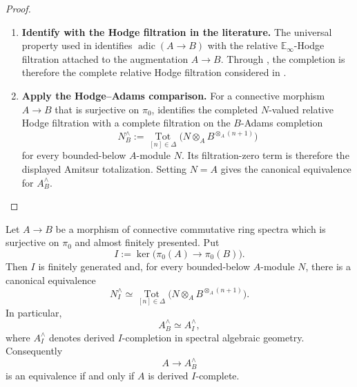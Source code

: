 \begin{proof}
\leavevmode
\begin{enumerate}[label=\textup{(\arabic*)}]
    \item \textbf{Identify with the Hodge filtration in the literature.}
    The universal property used in
     identifies
    \(\operatorname{adic}(A\to B)\) with the relative
    \(\mathbb E_\infty\)-Hodge filtration attached to the augmentation
    \(A\to B\). Through
    , the completion is therefore the
    complete relative Hodge filtration considered in
    \cite[Construction~2.1 and Lemma~2.2]{AntieauFiltrationsCohomologyIII2025}.
    \item \textbf{Apply the Hodge--Adams comparison.}
    For a connective morphism \(A\to B\) that is surjective on \(\pi_0\),
    \cite[Proposition~2.17]{AntieauFiltrationsCohomologyIII2025} identifies the
    completed \(N\)-valued relative Hodge filtration with a complete
    filtration on the \(B\)-Adams completion
    \[
        N_B^\wedge
        :=
        \operatorname*{Tot}_{[n]\in\Delta}
        \bigl(N\otimes_A B^{\otimes_A(n+1)}\bigr)
    \]
    for every bounded-below \(A\)-module \(N\). Its filtration-zero term is
    therefore the displayed Amitsur totalization. Setting \(N=A\) gives the
    canonical equivalence for \(A_B^\wedge\).
\end{enumerate}
\end{proof}

\begin{theorem}
\label{thm:adic-adams-derived-completion}
Let \(A\to B\) be a morphism of connective commutative ring spectra which is
surjective on \(\pi_0\) and almost finitely presented. Put
\[
    I:=\ker\bigl(\pi_0(A)\to\pi_0(B)\bigr).
\]
Then \(I\) is finitely generated and, for every bounded-below \(A\)-module
\(N\), there is a canonical equivalence
\[
    N_I^\wedge
    \simeq
    \operatorname*{Tot}_{[n]\in\Delta}
    \bigl(N\otimes_A B^{\otimes_A(n+1)}\bigr).
\]
In particular,
\[
    A_B^\wedge
    \simeq
    A_I^\wedge,
\]
where \(A_I^\wedge\) denotes derived \(I\)-completion in spectral algebraic
geometry. Consequently
\[
    A\longrightarrow A_B^\wedge
\]
is an equivalence if and only if \(A\) is derived \(I\)-complete.
\end{theorem}


